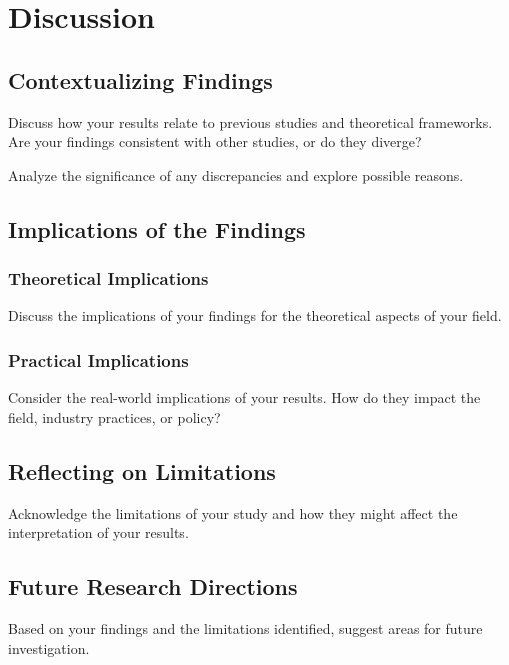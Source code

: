 \chapter{Discussion}\label{ch:Discussion}


\section{Contextualizing Findings}

Discuss how your results relate to previous studies and theoretical frameworks. Are your findings consistent with other studies, or do they diverge?

Analyze the significance of any discrepancies and explore possible reasons.


\section{Implications of the Findings}

\subsection{Theoretical Implications}

Discuss the implications of your findings for the theoretical aspects of your field.

\subsection{Practical Implications}

Consider the real-world implications of your results. How do they impact the field, industry practices, or policy?


\section{Reflecting on Limitations}

Acknowledge the limitations of your study and how they might affect the interpretation of your results.


\section{Future Research Directions}

Based on your findings and the limitations identified, suggest areas for future investigation.
